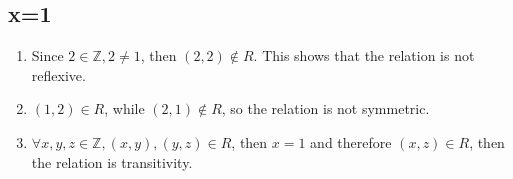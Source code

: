 \documentclass[a4paper,12pt,titlepage]{article}
\begin{document}
\subsection{x=1}
\begin{enumerate}
\item Since $2\in\mathbb{Z},2\neq1$, then $(2,2)\notin R$. This shows that the relation is not reflexive.
\item $(1,2)\in R$, while $(2,1)\notin R$, so the relation is not symmetric.
\item $\forall x,y,z\in\mathbb{Z},(x,y),(y,z)\in R$, then $x=1$ and therefore $(x,z)\in R$, then the relation is transitivity.
\end{enumerate}
\end{document}
